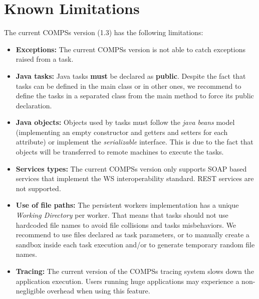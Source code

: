 \section{Known Limitations}
\label{sec:Known_Limitations}

The current COMPSs version (1.3) has the following limitations: 
\begin{itemize}
 \item \textbf{Exceptions:} \newline The current COMPSs version is not able to catch exceptions raised from a task.
 
 \item \textbf{Java tasks:} \newline Java tasks \textbf{must} be declared as \textbf{public}. Despite the fact that tasks can be
 defined in the main class or in other ones, we recommend to define the tasks in a separated class from the main method to force
 its public declaration.
 
 \item \textbf{Java objects:} \newline Objects used by tasks must follow the \textit{java beans} model (implementing an empty 
 constructor and getters and setters for each attribute) or implement the \textit{serializable} interface. This is due to the 
 fact that objects will be transferred to remote machines to execute the tasks.
 
 \item \textbf{Services types:} \newline The current COMPSs version only supports SOAP based services that implement the WS 
 interoperability standard. REST services are not supported.
 
 \item \textbf{Use of file paths:} \newline The persistent workers implementation has a unique \textit{Working Directory} per 
 worker. That means that tasks should not use hardcoded file names to avoid file collisions and tasks misbehaviors. We recommend to
 use files declared as task parameters, or to manually create a sandbox inside each task execution and/or to generate temporary 
 random file names. 
 
 \item \textbf{Tracing:} \newline The current version of the COMPSs tracing system slows down the application execution. Users
 running huge applications may experience a non-negligible overhead when using this feature. 
 

\end{itemize}
